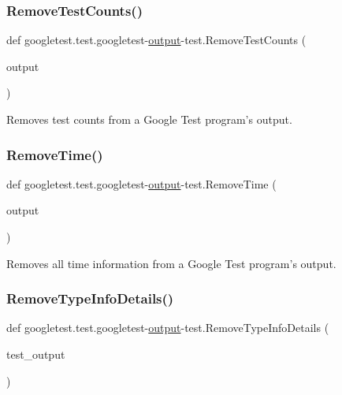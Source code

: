 \subsubsection{\texorpdfstring{RemoveTestCounts()}{RemoveTestCounts()}}
{\footnotesize\ttfamily def googletest.\+test.\+googletest-\/\mbox{\hyperlink{namespacegoogletest_1_1test_1_1googletest-output-test_a6773c2217ae4694b4db5610620562437}{output}}-\/test.\+Remove\+Test\+Counts (\begin{DoxyParamCaption}\item[{}]{output }\end{DoxyParamCaption})}

\begin{DoxyVerb}Removes test counts from a Google Test program's output.\end{DoxyVerb}
 \mbox{\label{namespacegoogletest_1_1test_1_1googletest-output-test_ac674d774c3fa9db5e31a2faba63a4cf9}} 
\subsubsection{\texorpdfstring{RemoveTime()}{RemoveTime()}}
{\footnotesize\ttfamily def googletest.\+test.\+googletest-\/\mbox{\hyperlink{namespacegoogletest_1_1test_1_1googletest-output-test_a6773c2217ae4694b4db5610620562437}{output}}-\/test.\+Remove\+Time (\begin{DoxyParamCaption}\item[{}]{output }\end{DoxyParamCaption})}

\begin{DoxyVerb}Removes all time information from a Google Test program's output.\end{DoxyVerb}
 \mbox{\label{namespacegoogletest_1_1test_1_1googletest-output-test_aa20c45603c87652d78a77427bd88276f}} 
\subsubsection{\texorpdfstring{RemoveTypeInfoDetails()}{RemoveTypeInfoDetails()}}
{\footnotesize\ttfamily def googletest.\+test.\+googletest-\/\mbox{\hyperlink{namespacegoogletest_1_1test_1_1googletest-output-test_a6773c2217ae4694b4db5610620562437}{output}}-\/test.\+Remove\+Type\+Info\+Details (\begin{DoxyParamCaption}\item[{}]{test\+\_\+output }\end{DoxyParamCaption})}

